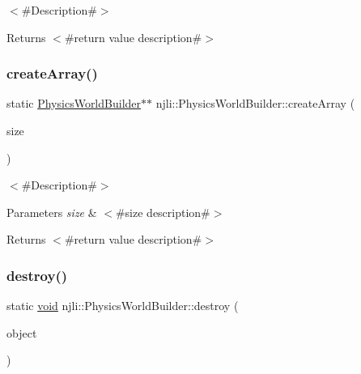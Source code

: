 $<$\#\+Description\#$>$

\begin{DoxyReturn}{Returns}
$<$\#return value description\#$>$ 
\end{DoxyReturn}
\mbox{\label{classnjli_1_1_physics_world_builder_aa8d4ae1e621ca869d29d09d6f619cd72}} 
\subsubsection{\texorpdfstring{create\+Array()}{createArray()}}
{\footnotesize\ttfamily static \mbox{\hyperlink{classnjli_1_1_physics_world_builder}{Physics\+World\+Builder}}$\ast$$\ast$ njli\+::\+Physics\+World\+Builder\+::create\+Array (\begin{DoxyParamCaption}\item[{const \mbox{\hyperlink{_util_8h_a10e94b422ef0c20dcdec20d31a1f5049}{u32}}}]{size }\end{DoxyParamCaption})\hspace{0.3cm}{\ttfamily [static]}}

$<$\#\+Description\#$>$


\begin{DoxyParams}{Parameters}
{\em size} & $<$\#size description\#$>$\\
\hline
\end{DoxyParams}
\begin{DoxyReturn}{Returns}
$<$\#return value description\#$>$ 
\end{DoxyReturn}
\mbox{\label{classnjli_1_1_physics_world_builder_a140d1567c171389e8dfadfef72d23335}} 
\subsubsection{\texorpdfstring{destroy()}{destroy()}}
{\footnotesize\ttfamily static \mbox{\hyperlink{_thread_8h_af1e856da2e658414cb2456cb6f7ebc66}{void}} njli\+::\+Physics\+World\+Builder\+::destroy (\begin{DoxyParamCaption}\item[{\mbox{\hyperlink{classnjli_1_1_physics_world_builder}{Physics\+World\+Builder}} $\ast$}]{object }\end{DoxyParamCaption})\hspace{0.3cm}{\ttfamily [static]}}

